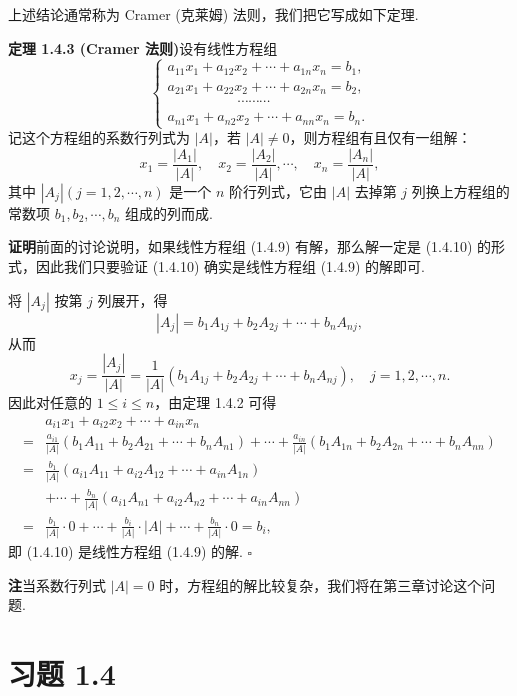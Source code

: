 \documentclass[UTF8, 12pt, fontset=fandol, oneside]{ctexart}
\begin{document}
上述结论通常称为 Cramer (克莱姆) 法则，我们把它写成如下定理.

\noindent\textbf{定理 1.4.3 (Cramer 法则)}\quad 设有线性方程组
\begin{equation}
\left\{
\begin{array}{l}
a_{11}x_1+a_{12}x_2+\cdots+a_{1n}x_n=b_1,\\
a_{21}x_1+a_{22}x_2+\cdots+a_{2n}x_n=b_2,\\
\hspace{5em}\cdots\cdots\cdots\\
a_{n1}x_1+a_{n2}x_2+\cdots+a_{nn}x_n=b_n.
\end{array}
\right.
\tag{1.4.9}
\end{equation}
记这个方程组的系数行列式为 $|A|$，若 $|A|\ne 0$，则方程组有且仅有一组解：
\begin{equation}
x_1=\frac{|A_1|}{|A|},\quad
x_2=\frac{|A_2|}{|A|},\cdots,\quad
x_n=\frac{|A_n|}{|A|},
\tag{1.4.10}
\end{equation}
其中 $|A_j|(j=1,2,\cdots,n)$ 是一个 $n$ 阶行列式，它由 $|A|$ 去掉第 $j$ 列换上方程组的常数项 $b_1,b_2,\cdots,b_n$ 组成的列而成.

\noindent\textbf{证明}\quad 前面的讨论说明，如果线性方程组 (1.4.9) 有解，那么解一定是 (1.4.10) 的形式，因此我们只要验证 (1.4.10) 确实是线性方程组 (1.4.9) 的解即可.

将 $|A_j|$ 按第 $j$ 列展开，得
\[
|A_j|=b_1A_{1j}+b_2A_{2j}+\cdots+b_nA_{nj},
\]
从而
\[
x_j=\frac{|A_j|}{|A|}
=\frac{1}{|A|}(b_1A_{1j}+b_2A_{2j}+\cdots+b_nA_{nj}),
\quad j=1,2,\cdots,n.
\]
因此对任意的 $1\le i\le n$，由定理 1.4.2 可得
\[
\begin{aligned}
&a_{i1}x_1+a_{i2}x_2+\cdots+a_{in}x_n\\
={}&
\frac{a_{i1}}{|A|}(b_1A_{11}+b_2A_{21}+\cdots+b_nA_{n1})
+\cdots+
\frac{a_{in}}{|A|}(b_1A_{1n}+b_2A_{2n}+\cdots+b_nA_{nn})\\
={}&
\frac{b_1}{|A|}(a_{i1}A_{11}+a_{i2}A_{12}+\cdots+a_{in}A_{1n})\\
&+\cdots+
\frac{b_n}{|A|}(a_{i1}A_{n1}+a_{i2}A_{n2}+\cdots+a_{in}A_{nn})\\
={}&
\frac{b_1}{|A|}\cdot 0+\cdots+\frac{b_i}{|A|}\cdot |A|
+\cdots+\frac{b_n}{|A|}\cdot 0=b_i,
\end{aligned}
\]
即 (1.4.10) 是线性方程组 (1.4.9) 的解. \(\square\)

\noindent\textbf{注}\quad 当系数行列式 $|A|=0$ 时，方程组的解比较复杂，我们将在第三章讨论这个问题.

\section*{习题 1.4}
\end{document}
